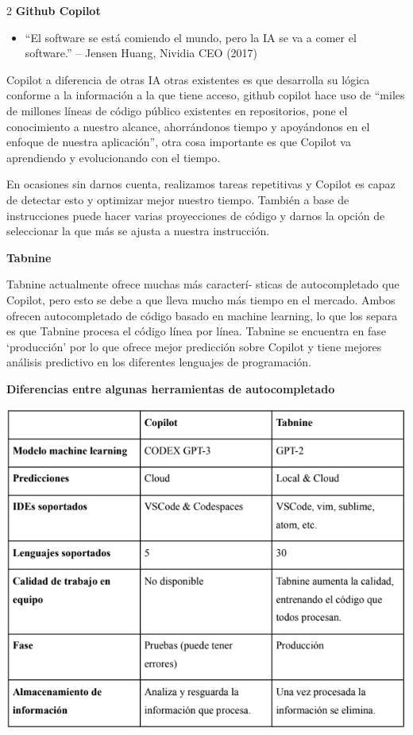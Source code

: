 \documentclass[12pt,spanish,Letterpaper,openany]{book}
\providecommand{\tightlist}{%
  \setlength{\itemsep}{0pt}\setlength{\parskip}{0pt}}
\begin{document}
\begin {multicols}{2}
\textbf{Github Copilot}

\begin{itemize}
\tightlist
\item
  ``El software se está comiendo el mundo, pero la IA se va a comer el software.'' -- Jensen Huang, Nividia CEO (2017)
\end{itemize}

Copilot a diferencia de otras IA otras existentes es que desarrolla su lógica conforme a la información a la que tiene acceso, github copilot hace uso de ``miles de millones líneas de código público existentes en repositorios, pone el conocimiento a nuestro alcance, ahorrándonos tiempo y apoyándonos en el enfoque de nuestra aplicación'', otra cosa importante es que Copilot va aprendiendo y evolucionando con el tiempo.

En ocasiones sin darnos cuenta, realizamos tareas repetitivas y Copilot es capaz de detectar esto y optimizar mejor nuestro tiempo. También a base de instrucciones puede hacer varias proyecciones de código y darnos la opción de seleccionar la que más se ajusta a nuestra instrucción.

\textbf{Tabnine}

Tabnine actualmente ofrece muchas más caracterí-
sticas de autocompletado que Copilot, pero esto se debe a que lleva mucho más tiempo en el mercado. Ambos ofrecen autocompletado de código basado en machine learning, lo que los separa es que Tabnine procesa el código línea por línea. Tabnine se encuentra en fase `producción' por lo que ofrece mejor predicción sobre Copilot y tiene mejores análisis predictivo en los diferentes lenguajes de programación.

\textbf{Diferencias entre algunas herramientas de autocompletado}

\begin {flushleft}
\noindent\begin{minipage}[c]{\columnwidth}

\includegraphics[width=1\linewidth]{images/pareja26_image2}


\end{minipage}
\end{flushleft}
\end{multicols}
\end{document}
